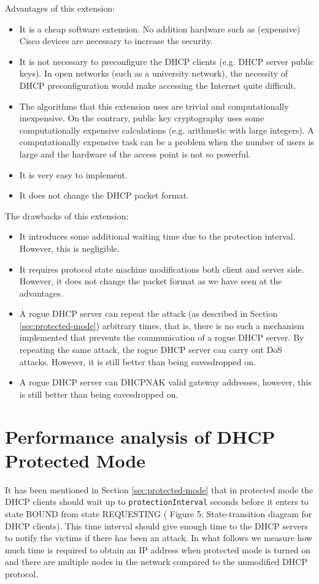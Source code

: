 \documentclass[letterpaper, 10 pt, conference]{ieeeconf}  %
\begin{document}
Advantages of this extension:
\begin{itemize}
\item It is a cheap software extension. No addition hardware such as (expensive) Cisco devices are necessary to increase the security.
\item It is not necessary to preconfigure the DHCP clients (e.g. DHCP server public keys). In open networks (such as a university network), the necessity of DHCP preconfiguration would make accessing the Internet quite difficult.
\item The algorithms that this extension uses are trivial and computationally inexpensive. On the contrary, public key cryptography uses some computationally expensive calculations (e.g. arithmetic with large integers). A computationally expensive task can be a problem when the number of users is large and the hardware of the access point is not so powerful.
\item It is very easy to implement.
\item It does not change the DHCP packet format.
\end{itemize}

The drawbacks of this extension:
\begin{itemize}
\item It introduces some additional waiting time due to the protection interval. However, this is negligible.
\item It requires protocol state machine modifications both client and server side. However, it does not change the packet format as we have seen at the advantages.
\item A rogue DHCP server can repeat the attack (as described in Section \ref{sec:protected-mode}) arbitrary times, that is, there is no such a mechanism implemented that prevents the communication of a rogue DHCP server. By repeating the same attack, the rogue DHCP server can carry out DoS attacks. However, it is still better than being eavesdropped on.
\item A rogue DHCP server can DHCPNAK valid gateway addresses, however, this is still better than being eavesdropped on.
\end{itemize}
\section{Performance analysis of DHCP Protected Mode}\label{sec:benchmark}
It has been mentioned in Section \ref{sec:protected-mode} that in protected mode the DHCP clients should wait up to \texttt{protectionInterval} seconds before it enters to state BOUND from state REQUESTING (\cite{dhcprfc} Figure 5:  State-transition diagram for DHCP clients). This time interval should give enough time to the DHCP servers to notify the victims if there has been an attack. In what follows we measure how much time is required to obtain an IP address when protected mode is turned on and there are multiple nodes in the network compared to the unmodified DHCP protocol.
\end{document}
